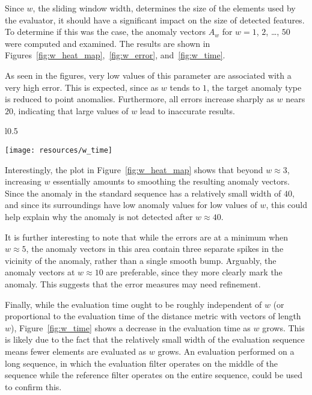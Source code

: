 Since $w$, the sliding window width, determines the size of the elements used by the evaluator, it should have a significant impact on the size of detected features. To determine if this was the case, the anomaly vectors $A_w$ for $w = 1$, $2$, \dots, $50$ were computed and examined. The results are shown in Figures~\ref{fig:w_heat_map},~\ref{fig:w_error}, and~\ref{fig:w_time}.

As seen in the figures, very low values of this parameter are associated with a very high error. This is expected, since as $w$ tends to $1$, the target anomaly type is reduced to point anomalies. Furthermore, all errors increase sharply as $w$ nears $20$, indicating that large values of $w$ lead to inaccurate results.

\begin{wrapfigure}{l}{0.5\textwidth}
    \vspace{-25pt}
    \begin{center}
        \texttt{[image: resources/w\_time]}
    \end{center}
    \vspace{-20pt}
    \caption{\small{Evaluation times for the anomaly vectors $A_w$.}}
\label{fig:w_time}
    \vspace{-20pt}
\end{wrapfigure}

Interestingly, the plot in Figure~\ref{fig:w_heat_map} shows that beyond $w \approx 3$, increasing $w$ essentially amounts to smoothing the resulting anomaly vectors. Since the anomaly in the standard sequence has a relatively small width of $40$, and since its surroundings have low anomaly values for low values of $w$, this could help explain why the anomaly is not detected after $w \approx 40$. 

It is further interesting to note that while the errors are at a minimum when $w \approx 5$, the anomaly vectors in this area contain three separate spikes in the vicinity of the anomaly, rather than a single smooth bump. Arguably, the anomaly vectors at $w \approx 10$ are preferable, since they more clearly mark the anomaly. This suggests that the error measures may need refinement.

Finally, while the evaluation time ought to be roughly independent of $w$ (or proportional to the evaluation time of the distance metric with vectors of length $w$), Figure~\ref{fig:w_time} shows a decrease in the evaluation time as $w$ grows. This is likely due to the fact that the relatively small width of the evaluation sequence means fewer elements are evaluated as $w$ grows. An evaluation performed on a long sequence, in which the evaluation filter operates on the middle of the sequence while the reference filter operates on the entire sequence, could be used to confirm this.

